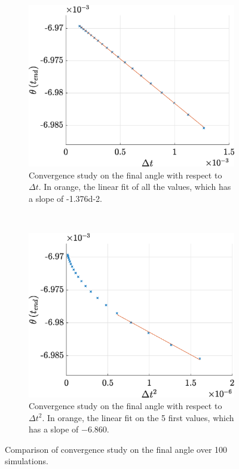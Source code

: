 \documentclass[a4paper,12pt,twoside]{article}
\begin{document}
\begin{figure}[h]
	\centering
	\begin{subfigure}[t]{0.48\textwidth}
		\includegraphics[width=\textwidth]{graphs/e_conv_dt1.eps}
		\caption{Convergence study on the final angle with respect to $\Delta t$. In orange, the linear fit of all the values, which has a slope of \num{-1.376d-2}.} %
		\label{fig:e-conv-dt1}
	\end{subfigure}
	~
	\begin{subfigure}[t]{0.48\textwidth}
		\includegraphics[width=\textwidth]{graphs/e_conv_dt2.eps}
		\caption{Convergence study on the final angle with respect to $\Delta t^2$. In orange, the linear fit on the 5 first values, which has a slope of \num{-6.860}.} %
		\label{fig:e-conv-dt2}
	\end{subfigure}
	\caption{Comparison of convergence study on the final angle over \num{100} simulations.}
	\label{fig:e-conv}
\end{figure}
\end{document}
